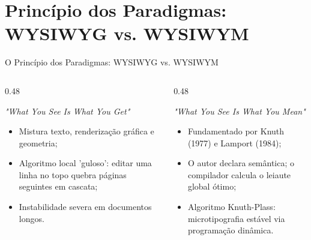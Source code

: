 \documentclass[aspectratio=169, 10pt]{beamer}
\begin{document}
\section{Princípio dos Paradigmas: WYSIWYG vs. WYSIWYM}

\begin{frame}{O Princípio dos Paradigmas: WYSIWYG vs. WYSIWYM}
  \begin{columns}[T]
    \begin{column}{0.48\textwidth}
      \begin{tcolorbox}[colback=iffalertbg,colframe=iffred,arc=1.5mm,title=\textbf{WYSIWYG: Microsoft Word}]
        \scriptsize \textit{"What You See Is What You Get"}
        \begin{itemize}\setlength{\itemsep}{2pt}
          \item Mistura texto, renderização gráfica e geometria;
          \item Algoritmo local 'guloso': editar uma linha no topo quebra páginas seguintes em cascata;
          \item Instabilidade severa em documentos longos.
        \end{itemize}
      \end{tcolorbox}
    \end{column}

    \begin{column}{0.48\textwidth}
      \begin{tcolorbox}[colback=iffgreenlight,colframe=iffprimary,arc=1.5mm,title=\textbf{WYSIWYM: O Sistema \LaTeX}]
        \scriptsize \textit{"What You See Is What You Mean"}
        \begin{itemize}\setlength{\itemsep}{2pt}
          \item Fundamentado por Knuth (1977) e Lamport (1984);
          \item O autor declara semântica; o compilador calcula o leiaute global ótimo;
          \item Algoritmo Knuth-Plass: microtipografia estável via programação dinâmica.
        \end{itemize}
      \end{tcolorbox}
    \end{column}
  \end{columns}
\end{frame}
\end{document}
